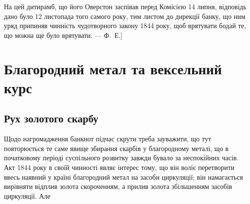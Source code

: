 На цей дитирамб, що його Оверстон заспівав перед Комісією 14 липня,
відповідь дано було 12 листопада того самого року, тим листом до дирекції
банку, що ним уряд припиняв чинність чудотворного закону 1844 року, щоб
врятувати бодай те, що можна ще було врятувати. — Ф.~Е.]

\section{Благородний метал та вексельний курс}

\subsection{Рух золотого скарбу}

Щодо нагромадження банкнот підчас скрути треба зауважити, що тут повторюється
те саме явище збирання скарбів у благородному металі, що в початковому
періоді суспільного розвитку завжди бувало за неспокійних часів. Акт
1844 року в своїй чинності являє інтерес тому, що він воліє перетворити ввесь
наявний у країні благородний метал на засоби циркуляції; він намагається вирівняти
відплив золота скороченням, а прилив золота збільшенням засобів циркуляції. Але
\parbreak{}  %
